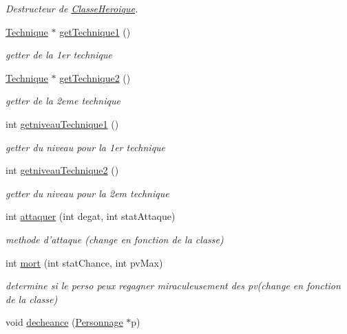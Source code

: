 \begin{DoxyCompactItemize}
\begin{DoxyCompactList}\small\item\em Destructeur de \hyperlink{classClasseHeroique}{Classe\-Heroique}. \end{DoxyCompactList}\item 
\hyperlink{classTechnique}{Technique} $\ast$ \hyperlink{classClasseHeroique_a4d08f6ae78e8248c438ab525e7834e17}{get\-Technique1} ()
\begin{DoxyCompactList}\small\item\em getter de la 1er technique \end{DoxyCompactList}\item 
\hyperlink{classTechnique}{Technique} $\ast$ \hyperlink{classClasseHeroique_aade6db9c42e96dc5f34c6263d6391208}{get\-Technique2} ()
\begin{DoxyCompactList}\small\item\em getter de la 2eme technique \end{DoxyCompactList}\item 
int \hyperlink{classClasseHeroique_a19f46bb0d05b35ce775680dcd0d3010b}{getniveau\-Technique1} ()
\begin{DoxyCompactList}\small\item\em getter du niveau pour la 1er technique \end{DoxyCompactList}\item 
int \hyperlink{classClasseHeroique_a61032db45e61f536821ae12e63922f5e}{getniveau\-Technique2} ()
\begin{DoxyCompactList}\small\item\em getter du niveau pour la 2em technique \end{DoxyCompactList}\item 
int \hyperlink{classClasseHeroique_a9811ee389e96597190e99cada8c241e7}{attaquer} (int degat, int stat\-Attaque)
\begin{DoxyCompactList}\small\item\em methode d'attaque (change en fonction de la classe) \end{DoxyCompactList}\item 
int \hyperlink{classClasseHeroique_a5bdbd46d2886a7e71eb1bff34ca5aa6c}{mort} (int stat\-Chance, int pv\-Max)
\begin{DoxyCompactList}\small\item\em determine si le perso peux regagner miraculeusement des pv(change en fonction de la classe) \end{DoxyCompactList}\item 
void \hyperlink{classClasseHeroique_a6aed4bac4cabc6eb09441ea1e2ef7b03}{decheance} (\hyperlink{classPersonnage}{Personnage} $\ast$p)

\end{DoxyCompactItemize}
